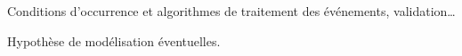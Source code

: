 Conditions d’occurrence et algorithmes de traitement des événements, validation…

Hypothèse de modélisation éventuelles. 
